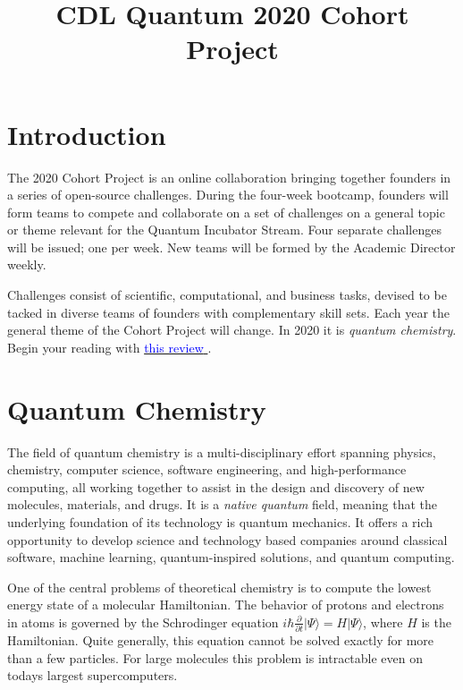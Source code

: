 \documentclass[12pt]{article}
\title{CDL Quantum 2020 Cohort Project}
\begin{document}
\maketitle

\thispagestyle{empty}
\section{Introduction}

The 2020 Cohort Project is an online collaboration bringing together founders in a series of open-source challenges.
During the four-week bootcamp, founders will form teams to compete and collaborate on a set of challenges on a general topic or theme
relevant for the Quantum Incubator Stream.  Four separate challenges will be issued; one per week.  New teams will be formed by the Academic Director weekly.

Challenges consist of scientific, computational, and business tasks, devised to be tacked in diverse teams of founders with complementary skill sets.  Each year
the general theme of the Cohort Project will change.  In 2020 it is {\it quantum chemistry}.  Begin your reading with 
\href{https://arxiv.org/abs/1812.09976}{\textcolor{blue}{this review} }.


\section{Quantum Chemistry}

The field of quantum chemistry is a multi-disciplinary effort spanning physics, chemistry, computer science, software engineering, and high-performance computing,
all working together to assist in the design and discovery of new molecules, materials, and drugs.  It is a {\it native quantum} field, meaning that the underlying
foundation of its technology is quantum mechanics. It offers a rich opportunity to develop science and technology 
based companies around classical software, machine learning, quantum-inspired solutions, and quantum computing.

One of the central problems of theoretical chemistry is to compute the lowest energy state of a molecular Hamiltonian. 
The behavior of protons and electrons in atoms is governed by the Schrodinger equation 
$i \hbar \frac{\partial }{ \partial t}  | \Psi \rangle = H | \Psi \rangle$, where $H$ is the Hamiltonian.
Quite generally, this equation cannot be solved exactly for more than a few particles.  
For large molecules this problem is intractable even on todays largest supercomputers. 
\end{document}
